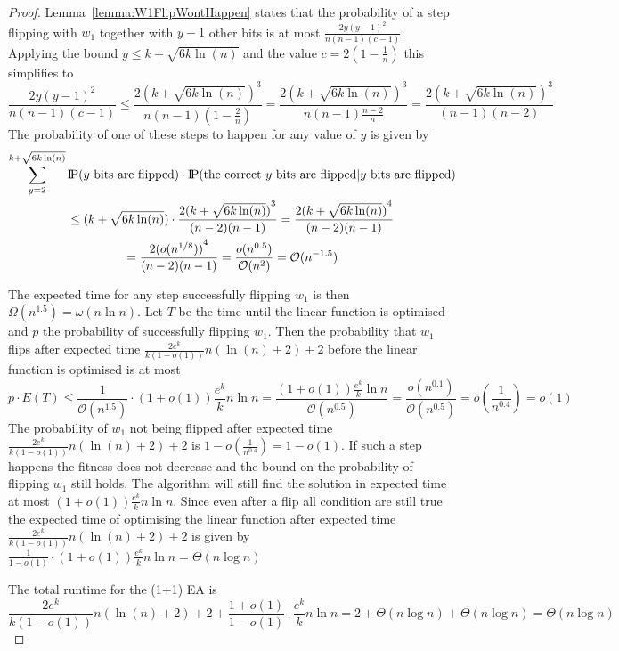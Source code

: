 \begin{proof}
    Lemma~\ref{lemma:W1FlipWontHappen} states that the probability of a step flipping with $w_1$ together with $y-1$ other bits is at most $\frac{2y{(y-1)}^2}{n(n-1)(c-1)}$.
    Applying the bound $y\le k+\sqrt{6k\ln(n)}$ and the value $c=2(1-\frac{1}{n})$ this simplifies to
    \[
        \frac{2y{(y-1)}^2}{n(n-1)(c-1)}
        \le\frac{2{(k+\sqrt{6k\ln(n)})}^3}{n(n-1)(1-\frac{2}{n})}
        =\frac{2{(k+\sqrt{6k\ln(n)})}^3}{n(n-1)\frac{n-2}{n}}
        =\frac{2{(k+\sqrt{6k\ln(n)})}^3}{(n-1)(n-2)}
    \]
    The probability of one of these steps to happen for any value of $y$ is given by
    \begin{gather}
        \nonumber \sum_{y=2}^{k+\sqrt{6k\ln(n)}}{\text{I\kern-0.15em P}(y \text{ bits are flipped})\cdot\text{I\kern-0.15em P}(\text{the correct $y$ bits are flipped} | y \text{ bits are flipped})}\\
        \nonumber \le ({k+\sqrt{6k\ln(n)}})\cdot\frac{2{(k+\sqrt{6k\ln(n)})}^{3}}{(n-2)(n-1)}
        = \frac{2{(k+\sqrt{6k\ln(n)})}^{4}}{(n-2)(n-1)}\\ \nonumber
        = \frac{2{(o({n}^{1/8}))}^{4}}{(n-2)(n-1)}
        = \frac{o(n^{0.5})}{\mathcal{O}(n^{2})}
        = \mathcal{O}(n^{-1.5})
    \end{gather}

    The expected time for any step successfully flipping $w_1$ is then $\Omega(n^{1.5})=\omega(n\ln n)$.
    Let $T$ be the time until the linear function is optimised and $p$ the probability of successfully flipping $w_1$.
    Then the probability that $w_1$ flips after expected time $\frac{2e^k}{k(1-o(1))}n(\ln(n)+2)+2$ before the linear function is optimised is at most
    \[
        p\cdot E(T) \le \frac{1}{\mathcal{O}(n^{1.5})}\cdot(1+o(1))\frac{e^k}{k}n\ln n
        =\frac{(1+o(1))\frac{e^k}{k}\ln n}{\mathcal{O}(n^{0.5})}
        =\frac{o(n^{0.1})}{\mathcal{O}(n^{0.5})}
        =o(\frac{1}{n^{0.4}})=o(1)\]
    The probability of $w_1$ not being flipped after expected time $\frac{2e^k}{k(1-o(1))}n(\ln(n)+2)+2$ is \(1-o(\frac{1}{n^{0.4}})=1-o(1)\).
    If such a step happens the fitness does not decrease and the bound on the probability of flipping $w_1$ still holds.
    The algorithm will still find the solution in expected time at most $(1+o(1))\frac{e^k}{k}n\ln n$.
    Since even after a flip all condition are still true the expected time of optimising the linear function after expected time $\frac{2e^k}{k(1-o(1))}n(\ln(n)+2)+2$ is given by \(\frac{1}{1-o(1)}\cdot(1+o(1))\frac{e^k}{k}n\ln n=\Theta(n\log{}n)\)

    The total runtime for the (1+1) EA is
    \[
        \frac{2e^k}{k(1-o(1))}n(\ln(n)+2)+2 + \frac{1+o(1)}{1-o(1)}\cdot \frac{e^k}{k}n\ln n
        =2+\Theta(n\log{}n)+\Theta(n\log{}n)
        =\Theta(n\log{}n)
    \]

\end{proof}

